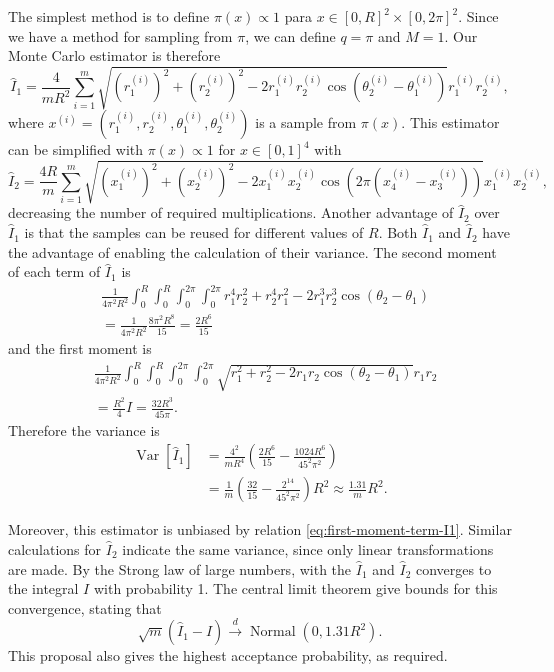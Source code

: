 \documentclass[a4paper,10pt, notitlepage]{report}
\newcommand{\var}{\operatorname{Var}}
\begin{document}
The simplest method is to define $\pi(x) \propto 1$ para $x \in [0,R]^2
\times [0,2\pi]^2$. Since we have a method for sampling from $\pi$, we can 
define $q = \pi$ and $M=1$. Our Monte Carlo estimator is therefore 
$$
\hat{I}_1 = \frac{4}{mR^2}\sum_{i=1}^m \sqrt{\left(r_1^{(i)}\right)^2 + \left(r_2^{(i)}\right)^2 - 2r_1^{(i)}r_2^{(i)}\cos\left(\theta_2^{(i)} - \theta_1^{(i)}\right)}r_1^{(i)}r_2^{(i)},
$$
where $x^{(i)} = \left(r_1^{(i)}, r_2^{(i)}, \theta_1^{(i)},
\theta_2^{(i)}\right)$ is a sample from $\pi(x)$. This estimator can be
simplified with $\pi(x) \propto 1$ for $x \in [0,1]^4$ with
$$
\hat{I}_2 = \frac{4R}{m}\sum_{i=1}^m \sqrt{\left(x_1^{(i)}\right)^2 + \left(x_2^{(i)}\right)^2 - 2x_1^{(i)}x_2^{(i)}\cos\left(2\pi\left(x_4^{(i)} - x_3^{(i)}\right)\right)}x_1^{(i)}x_2^{(i)},
$$
decreasing the number of required multiplications. Another advantage of
$\hat{I}_2$ over $\hat{I}_1$ is that the samples can be reused for different
values of $R$. Both $\hat{I}_1$ and $\hat{I}_2$ have the advantage of
enabling the calculation of their variance. The second moment of each term of $\hat{I}_1$ is
\begin{align*}
    &\frac{1}{4\pi^2 R^2}\int_{0}^{R}\int_{0}^{R}\int_{0}^{2\pi}\int_{0}^{2\pi}r_1^4r_2^2 + r_2^4r_1^2 - 2r_1^3r_2^3\cos(\theta_2 - \theta_1) \\
    &= \frac{1}{4\pi^2 R^2}\frac{8\pi^2 R^8}{15} = \frac{2R^6}{15}
\end{align*}
and the first moment is
\begin{equation}
    \label{eq:first-moment-term-I1}
    \begin{split}
        &\frac{1}{4\pi^2 R^2}\int_{0}^{R}\int_{0}^{R}\int_{0}^{2\pi}\int_{0}^{2\pi}\sqrt{r_1^2 + r_2^2 - 2r_1r_2\cos(\theta_2 - \theta_1)}r_1r_2 \\
        &= \frac{R^2}{4} I = \frac{32R^3}{45\pi}.     
    \end{split}
\end{equation}
Therefore the variance is 
\begin{equation*}
    \begin{split}
        \var[\hat{I}_1] &= \frac{4^2}{mR^4}\left(\frac{2R^6}{15} - \frac{1024R^6}{45^2\pi^2}\right) \\
        &= \frac{1}{m}\left(\frac{32}{15} - \frac{2^{14}}{45^2\pi^2}\right)R^2 \approx \frac{1.31}{m}R^2. 
    \end{split}    
\end{equation*}

Moreover, this estimator is unbiased by relation
\eqref{eq:first-moment-term-I1}. Similar calculations for $\hat{I}_2$ indicate
the same variance, since only linear transformations are made. By the Strong
law of large numbers, with the $\hat{I}_1$ and $\hat{I}_2$ converges to the
integral $I$  with probability 1. The central limit theorem give bounds for
this convergence, stating that 
$$
\sqrt{m}(\hat{I}_1 - I) \overset{d}{\to} \operatorname{Normal}(0, 1.31R^2). 
$$
This proposal also gives the highest acceptance probability, as required. 
\end{document}
